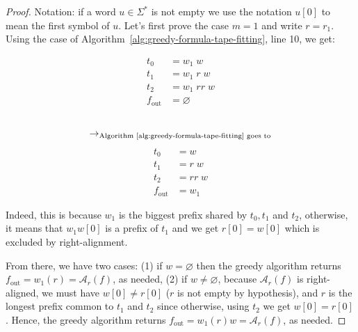 \begin{proof}
    Notation: if a word $u\in\Sigma^*$ is not empty we use the notation $u[0]$ to mean the first symbol of $u$.
    Let's first prove the case $m=1$ and write $r = r_1$. Using the case of Algorithm~\ref{alg:greedy-formula-tape-fitting}, line 10, we get:
    \setlength{\columnsep}{-7.5cm}
    \begin{multicols}{3}
        \noindent
        \begin{align*}
            t_0          & = w_1\;  w      \\
            t_1          & = w_1\; r\;  w  \\
            t_2          & = w_1\; r r\; w \\
            f_\text{out} & = \varnothing
        \end{align*}
        \begin{align*}
             & \\
            \to_{\text{Algorithm~\ref{alg:greedy-formula-tape-fitting} goes to}}
        \end{align*}
        \begin{align*}
            t_0          & = w        \\
            t_1          & = r\;  w   \\
            t_2          & = r r\;  w \\
            f_\text{out} & = w_1
        \end{align*}
    \end{multicols}

    Indeed, this is because $w_1$ is the biggest prefix shared by $t_0, t_1$ and $t_2$, otherwise, it means that $w_1w[0]$ is a prefix of $t_1$ and we get $r[0] = w[0]$ which is excluded by right-alignment.

    From there, we have two cases: (1) if $w = \varnothing$ then the greedy algorithm returns $f_\text{out} = w_1 (r) = \mathcal{A}_r(f)$, as needed, (2) if $w \neq \varnothing$, because $\mathcal{A}_r(f)$ is right-aligned, we must have $w[0] \neq r[0]$ ($r$ is not empty by hypothesis), and $r$ is the longest prefix common to $t_1$ and $t_2$ since otherwise, using $t_2$ we get $w[0] = r[0]$. Hence, the greedy algorithm returns $f_\text{out} = w_1 (r) w = \mathcal{A}_r(f)$, as needed.



\end{proof}

